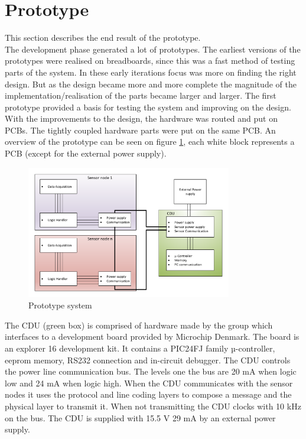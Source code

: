 \section{Prototype}
This section describes the end result of the prototype.\\
The development phase generated a lot of prototypes. The earliest versions of the prototypes were realised on breadboards, since this was a fast method of testing parts of the system. In these early iterations focus was more on finding the right design. But as the design became more and more complete the magnitude of the implementation/realisation of the parts became larger and larger. The first prototype provided a basis for testing the system and improving on the design. With the improvements to the design, the hardware was routed and put on PCBs. The tightly coupled hardware parts were put on the same PCB. An overview of the prototype can be seen on figure \ref{fig:prototype}, each white block represents a PCB (except for the external power supply).
\begin{figure}[H]
	\centering
	\includegraphics[width=0.8\textwidth]{billeder/11ProjectDescription/prototypesystem}
	\caption{Prototype system}
	\label{fig:prototype}
\end{figure}
The CDU (green box) is comprised of hardware made by the group which interfaces to a development board provided by Microchip Denmark. The board is an explorer 16 development kit. It contains a PIC24FJ family µ-controller, eeprom memory, RS232 connection and in-circuit debugger. The CDU controls the power line communication bus. The levels one the bus are 20 mA when logic low and 24 mA when logic high. When the CDU communicates with the sensor nodes it uses the protocol and line coding layers to compose a message and the physical layer to transmit it. When not transmitting the CDU clocks with 10 kHz on the bus. The CDU is supplied with 15.5 V 29 mA by an external power supply. 

